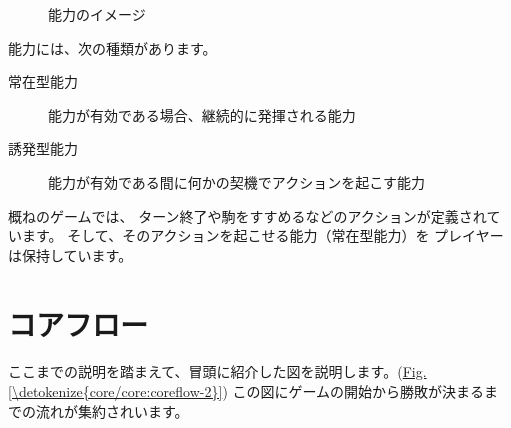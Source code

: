 \documentclass[letterpaper,10pt,dvipdfmx]{sphinxmanual}
\begin{document}
\begin{figure}[htbp]
\centering
\capstart

\noindent{}
\caption{能力のイメージ}\label{\detokenize{core/core:id18}}\label{\detokenize{core/core:ability-image}}\end{figure}

能力には、次の種類があります。
\begin{description}
\item[{常在型能力}] \leavevmode
能力が有効である場合、継続的に発揮される能力

\item[{誘発型能力}] \leavevmode
能力が有効である間に何かの契機でアクションを起こす能力

\end{description}

概ねのゲームでは、
ターン終了や駒をすすめるなどのアクションが定義されています。
そして、そのアクションを起こせる能力（常在型能力）を
プレイヤーは保持しています。


\section{コアフロー}
\label{\detokenize{core/core:id14}}
ここまでの説明を踏まえて、冒頭に紹介した図を説明します。(\hyperref[\detokenize{core/core:coreflow-2}]{Fig.\@ \ref{\detokenize{core/core:coreflow-2}}})
この図にゲームの開始から勝敗が決まるまでの流れが集約されいます。
\end{document}
